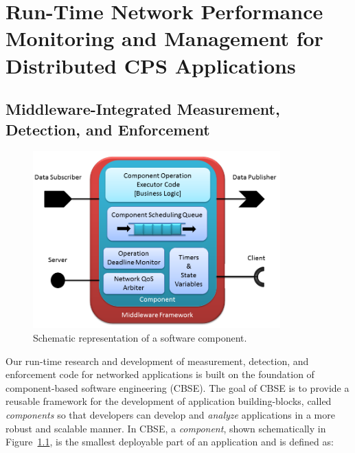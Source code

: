 \chapter{Run-Time Network Performance Monitoring and Management for Distributed CPS Applications}
\label{ch:runTime}

\section{Middleware-Integrated Measurement, Detection, and Enforcement}
\label{sec:middleware}

\begin{figure}[ht!]
  \centering
  \includegraphics[width=0.85\textwidth]{../doc/src/images/results/ros_component.png}
  \caption{Schematic representation of a software component.}
  \label{fig:component}
\end{figure}

Our run-time research and development of measurement, detection, and
enforcement code for networked applications is built on the foundation
of component-based software engineering (CBSE).  The goal of CBSE is
to provide a reusable framework for the development of application
building-blocks, called \emph{components} so that developers can develop
and \emph{analyze} applications in a more robust and scalable manner.  In
CBSE, a \emph{component}, shown schematically in
Figure~\ref{fig:component}, is the smallest deployable part of an
application and is defined as:


